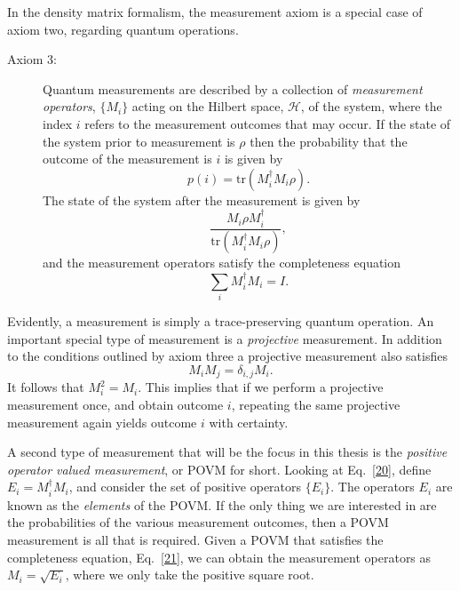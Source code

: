 \documentclass{article}
\newcommand\defn[1]{\textsl{#1}}
\newcommand\cH{{\mathscr{H}}}
\begin{document}
In the density matrix formalism, the measurement axiom is a special case of axiom two, regarding quantum operations. 
\begin{description}
\item[Axiom 3:]  Quantum measurements are described by a collection of \defn{measurement operators}, $\{M_i\}$ acting on the Hilbert space, $\cH$, of the system, where the index $i$ refers to the measurement outcomes that may occur.  If the state of the system
prior to measurement is $\rho$ then the probability that the outcome of the
measurement is $i$ is given by
\begin{equation}
p(i)=\mathrm{tr}\left(M_i^{\dagger}M_i\rho\right).
\label{18}
\end{equation} 
The state of the system after the measurement is given by 
\begin{equation}
\frac{M_i\rho M_i^{\dagger}}{\mathrm{tr}\left(M_i^{\dagger}M_i\rho\right)},
\label{19}
\end{equation} 
and the measurement operators satisfy the completeness equation
\begin{equation}
\sum_i M_i^{\dagger}M_i=I.
\label{20}
\end{equation}
\end{description}
Evidently, a measurement is simply a trace-preserving quantum operation.  An
important special type of measurement is a \defn{projective} measurement.  In
addition to the conditions outlined by axiom three a projective measurement also
satisfies
\begin{equation}
M_iM_j=\delta_{i,j} M_i.
\label{21}
\end{equation}
It follows that $M_i^2=M_i$.  This implies that if we perform a projective
measurement once, and obtain outcome $i$, repeating the same projective
measurement again yields outcome $i$ with certainty.

A second type of measurement that will be the focus in this thesis is the
\defn{positive operator valued measurement}, or POVM for short.  Looking at
Eq.~\eqref{20}, define $E_i=M_i^{\dagger}M_i$, and consider the set of positive
operators $\{E_i\}$.  The operators $E_i$ are known as the \defn{elements} of
the POVM.  If the only thing we are interested in are the probabilities of the
various measurement outcomes, then a POVM measurement is all that is required. 
Given a POVM that satisfies the completeness equation, Eq.~\eqref{21}, we can
obtain the measurement operators as $M_i=\sqrt{E_i}$, where we only take the positive square root.        
\end{document}
